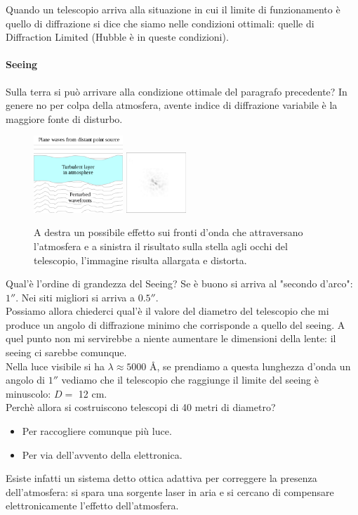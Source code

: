 Quando un telescopio arriva alla situazione in cui il limite di funzionamento è quello di diffrazione si dice che siamo nelle condizioni ottimali: quelle di Diffraction Limited (Hubble è in queste condizioni). 
\paragraph{Seeing}%
Sulla terra si può arrivare alla condizione ottimale del paragrafo precedente? In genere no per colpa della atmosfera, avente indice di diffrazione variabile è la maggiore fonte di disturbo.
\begin{figure}[H]
	\centering
	\includegraphics[width=0.3\textwidth]{figures/seeing.png}
	\includegraphics[width=0.2\textwidth]{figures/seeing-effect.png}
	\caption{\scriptsize A destra un possibile effetto sui fronti d'onda che attraversano l'atmosfera e a sinistra il risultato sulla stella agli occhi del telescopio, l'immagine risulta allargata e distorta.}
	\label{fig:figures-seeing-png}
\end{figure}
\noindent
Qual'è l'ordine di grandezza del Seeing? Se è buono si arriva al "secondo d'arco": $1''$. Nei siti migliori si arriva a $0.5''$.\\
Possiamo allora chiederci qual'è il valore del diametro del telescopio che mi produce un angolo di diffrazione minimo che corrisponde a quello del seeing. A quel punto non mi servirebbe a niente aumentare le dimensioni della lente: il seeing ci sarebbe comunque.\\
Nella luce visibile si ha $\lambda \approx 5000$ \AA, se prendiamo a questa lunghezza d'onda un angolo di $1''$ vediamo che il telescopio che raggiunge il limite del seeing è minuscolo: $D=$ 12 cm.\\
Perchè allora si costruiscono telescopi di 40 metri di diametro?
\begin{itemize}
	\item Per raccogliere comunque più luce.
	\item Per via dell'avvento della elettronica.
\end{itemize}
Esiste infatti un sistema detto ottica adattiva per correggere la presenza dell'atmosfera: si spara una sorgente laser in aria e si cercano di compensare elettronicamente l'effetto dell'atmosfera.

